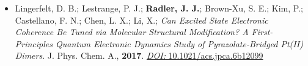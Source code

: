 \documentclass[letterpaper]{radler-resume-class}
\begin{document}
\begin{minipage}[t]{0.65\textwidth}
\begin{itemize}
\item Lingerfelt, D. B.; Lestrange, P. J.; \textbf{Radler, J. J.}; Brown-Xu, S. E.; Kim, P.; Castellano, F. N.; Chen, L. X.; Li, X.;	\textit{Can Excited State Electronic Coherence Be Tuned via Molecular Structural Modification? A First-Principles Quantum Electronic Dynamics Study of Pyrazolate-Bridged Pt(II) Dimers}.
J. Phys. Chem. A., \textbf{2017}. \href{https://pubs.acs.org/doi/10.1021/acs.jpca.6b12099}{\textit{DOI:} 10.1021/acs.jpca.6b12099}
\end{itemize}

\end{minipage} %


\newpage %


\end{document}
